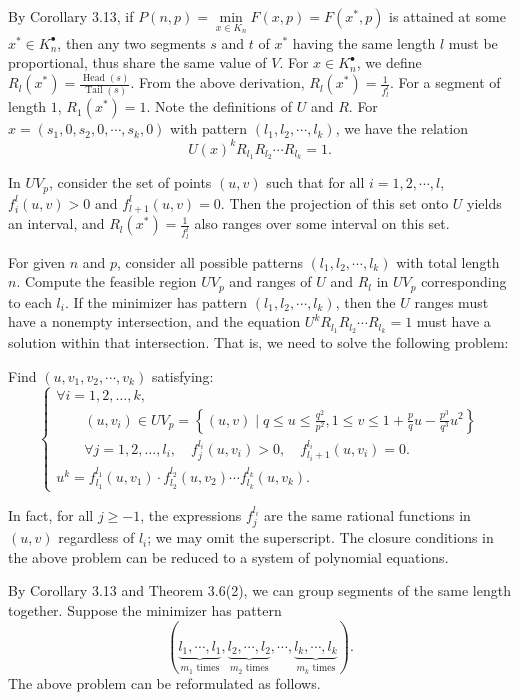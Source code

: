 \documentclass[a4paper,fleqn,numbers]{cas-sc}
\DeclareMathOperator{\Head}{Head}
\DeclareMathOperator{\Tail}{Tail}
\begin{document}
	By Corollary 3.13, if $P(n,p)=\min\limits_{x \in K_n} F(x,p)=F(x^*,p)$ is attained at some $x^*\in K_n^{\bullet}$, then any two segments $s$ and $t$ of $x^*$ having the same length $l$ must be proportional, thus share the same value of $V$. For $x\in K_n^{\bullet}$, we define $R_l(x^*)=\frac{\Head(s)}{\Tail(s)}$. From the above derivation, $R_l(x^*)=\frac{1}{f_l^l}$. For a segment of length $1$, $R_1(x^*)=1$. Note the definitions of $U$ and $R$. For $x=(s_1,0,s_2,0,\cdots,s_k,0)$ with pattern $(l_1,l_2,\cdots,l_k)$, we have the relation
	\[
	U(x)^k R_{l_1}R_{l_2}\cdots R_{l_k}=1.
	\]
	
	In $UV_p$, consider the set of points $(u,v)$ such that for all $i=1,2,\cdots,l$, $f_i^l(u,v)>0$ and $f_{l+1}^l(u,v)=0$. Then the projection of this set onto $U$ yields an interval, and $R_l(x^*)=\frac{1}{f_l^l}$ also ranges over some interval on this set.
	
	For given $n$ and $p$, consider all possible patterns $(l_1,l_2,\cdots,l_k)$ with total length $n$. Compute the feasible region $UV_p$ and ranges of $U$ and $R_l$ in $UV_p$ corresponding to each $l_i$. If the minimizer has pattern $(l_1,l_2,\cdots,l_k)$, then the $U$ ranges must have a nonempty intersection, and the equation $U^k R_{l_1}R_{l_2}\cdots R_{l_k}=1$ must have a solution within that intersection. That is, we need to solve the following problem:
	
	Find $(u,v_1,v_2,\cdots,v_k)$ satisfying:
	\[
	\left\{
	\begin{array}{l}
		\forall i=1,2,\ldots,k, \\
		\qquad (u,v_i)\in UV_p=\left\{(u,v)\mid q\leq u\leq\frac{q^2}{p^2},1\leq v\leq1+\frac{p}{q}u-\frac{p^3}{q^3}u^2\right\}\\
		\qquad \forall j=1,2,\ldots,l_i, \quad f_j^{l_i}(u, v_i) > 0, \quad f_{l_i+1}^{l_i}(u, v_i) = 0. \\
		u^k = f_{l_1}^{l_1}(u, v_1) \cdot f_{l_2}^{l_2}(u, v_2) \cdots f_{l_k}^{l_k}(u, v_k).
	\end{array}
	\right.\tag{Q}
	\]
	
	In fact, for all $j \geq -1$, the expressions $f_j^{l_i}$ are the same rational functions in $(u,v)$ regardless of $l_i$; we may omit the superscript. The closure conditions in the above problem can be reduced to a system of polynomial equations.
	
	By Corollary 3.13 and Theorem 3.6(2), we can group segments of the same length together. Suppose the minimizer has pattern
	\[
	(\underbrace{l_1,\cdots,l_1}_{m_1\text{ times}},\underbrace{l_2,\cdots,l_2}_{m_2\text{ times}},\cdots,\underbrace{l_k,\cdots,l_k}_{m_k\text{ times}}).
	\]
	The above problem can be reformulated as follows.
	
\end{document}
